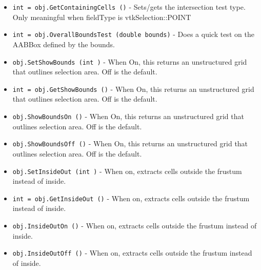 \begin{itemize}
\item  \verb|int = obj.GetContainingCells ()| -  Sets/gets the intersection test type. Only meaningful when fieldType is 
 vtkSelection::POINT

\item  \verb|int = obj.OverallBoundsTest (double bounds)| -  Does a quick test on the AABBox defined by the bounds.

\item  \verb|obj.SetShowBounds (int )| -  When On, this returns an unstructured grid that outlines selection area.
 Off is the default.

\item  \verb|int = obj.GetShowBounds ()| -  When On, this returns an unstructured grid that outlines selection area.
 Off is the default.

\item  \verb|obj.ShowBoundsOn ()| -  When On, this returns an unstructured grid that outlines selection area.
 Off is the default.

\item  \verb|obj.ShowBoundsOff ()| -  When On, this returns an unstructured grid that outlines selection area.
 Off is the default.

\item  \verb|obj.SetInsideOut (int )| -  When on, extracts cells outside the frustum instead of inside.

\item  \verb|int = obj.GetInsideOut ()| -  When on, extracts cells outside the frustum instead of inside.

\item  \verb|obj.InsideOutOn ()| -  When on, extracts cells outside the frustum instead of inside.

\item  \verb|obj.InsideOutOff ()| -  When on, extracts cells outside the frustum instead of inside.

\end{itemize}
